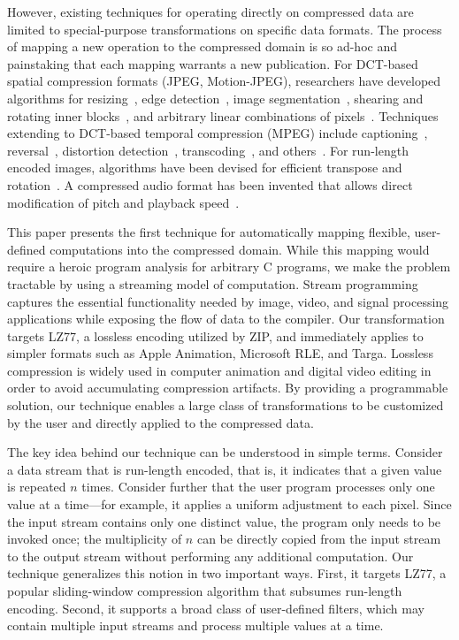 However, existing techniques for operating directly on compressed data
are limited to special-purpose transformations on specific data
formats.  The process of mapping a new operation to the compressed
domain is so ad-hoc and painstaking that each mapping warrants a new
publication.  For DCT-based spatial compression formats (JPEG,
Motion-JPEG), researchers have developed algorithms for
resizing~\cite{dugad01,mukherjee02}, edge
detection~\cite{shen96,shen96b}, image segmentation~\cite{feng03},
shearing and rotating inner blocks~\cite{shen98}, and arbitrary linear
combinations of pixels~\cite{smith96b}.  Techniques extending to
DCT-based temporal compression (MPEG) include captioning~\cite{nang00},
reversal~\cite{vasudev98}, distortion detection~\cite{dorai00},
transcoding~\cite{smith98}, and others~\cite{wee02survey}.  For
run-length encoded images, algorithms have been devised for efficient
transpose and rotation~\cite{misra99,shoji95}.  A compressed audio
format has been invented that allows direct modification of pitch and
playback speed~\cite{levine98}.

This paper presents the first technique for automatically mapping
flexible, user-defined computations into the compressed domain.  While
this mapping would require a heroic program analysis for arbitrary C
programs, we make the problem tractable by using a streaming model of
computation.  Stream programming captures the essential functionality
needed by image, video, and signal processing applications while
exposing the flow of data to the compiler.  Our transformation targets
LZ77, a lossless encoding utilized by ZIP, and immediately applies to
simpler formats such as Apple Animation, Microsoft RLE, and Targa.
Lossless compression is widely used in computer animation and digital
video editing in order to avoid accumulating compression artifacts.
By providing a programmable solution, our technique enables a large
class of transformations to be customized by the user and directly
applied to the compressed data.

The key idea behind our technique can be understood in simple terms.
Consider a data stream that is run-length encoded, that is, it
indicates that a given value is repeated $n$ times.  Consider further
that the user program processes only one value at a time---for
example, it applies a uniform adjustment to each pixel.  Since the
input stream contains only one distinct value, the program only needs
to be invoked once; the multiplicity of $n$ can be directly copied
from the input stream to the output stream without performing any
additional computation.  Our technique generalizes this notion in two
important ways.  First, it targets LZ77, a popular sliding-window
compression algorithm that subsumes run-length encoding.  Second, it
supports a broad class of user-defined filters, which may contain
multiple input streams and process multiple values at a time.


